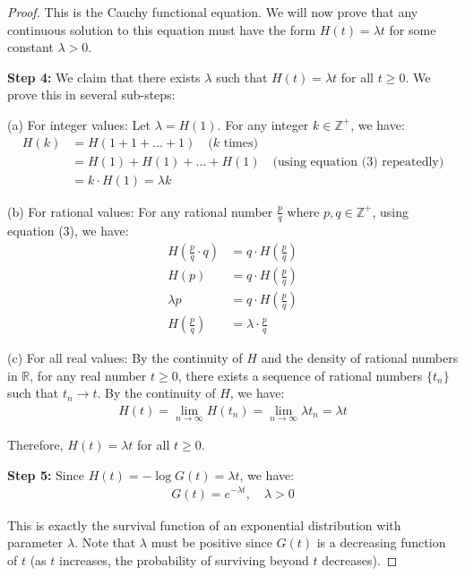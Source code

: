 \begin{proof}
    This is the Cauchy functional equation. We will now prove that any continuous solution to this equation must have the form $H(t) = \lambda t$ for some constant $\lambda > 0$.
    
    \textbf{Step 4:} We claim that there exists $\lambda$ such that $H(t) = \lambda t$ for all $t \geq 0$. We prove this in several sub-steps:
    
    (a) For integer values: Let $\lambda = H(1)$. For any integer $k \in \mathbb{Z}^+$, we have:
    \begin{align*}
    H(k) &= H(1 + 1 + \ldots + 1) \quad \text{($k$ times)} \\
    &= H(1) + H(1) + \ldots + H(1) \quad \text{(using equation (3) repeatedly)} \\
    &= k \cdot H(1) = \lambda k
    \end{align*}
    
    (b) For rational values: For any rational number $\frac{p}{q}$ where $p, q \in \mathbb{Z}^+$, using equation (3), we have:
    \begin{align*}
    H\left(\frac{p}{q} \cdot q\right) &= q \cdot H\left(\frac{p}{q}\right) \\
    H(p) &= q \cdot H\left(\frac{p}{q}\right) \\
    \lambda p &= q \cdot H\left(\frac{p}{q}\right) \\
    H\left(\frac{p}{q}\right) &= \lambda \cdot \frac{p}{q}
    \end{align*}
    
    (c) For all real values: By the continuity of $H$ and the density of rational numbers in $\mathbb{R}$, for any real number $t \geq 0$, there exists a sequence of rational numbers $\{t_n\}$ such that $t_n \to t$. By the continuity of $H$, we have:
    \begin{align*}
    H(t) = \lim_{n \to \infty} H(t_n) = \lim_{n \to \infty} \lambda t_n = \lambda t
    \end{align*}
    
    Therefore, $H(t) = \lambda t$ for all $t \geq 0$.
    
    \textbf{Step 5:} Since $H(t) = -\log G(t) = \lambda t$, we have:
    \begin{align*}
    G(t) = e^{-\lambda t}, \quad \lambda > 0
    \end{align*}
    
    This is exactly the survival function of an exponential distribution with parameter $\lambda$. Note that $\lambda$ must be positive since $G(t)$ is a decreasing function of $t$ (as $t$ increases, the probability of surviving beyond $t$ decreases).
    

\end{proof}
